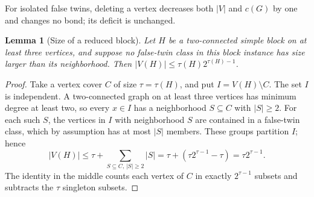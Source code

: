 \documentclass[11pt]{article}
\newtheorem{lemma}[theorem]{Lemma}
\begin{document}
For isolated false twins, deleting a vertex decreases both $|V|$
and $c(G)$ by one and changes no bond; its deficit is unchanged.

\begin{lemma}[Size of a reduced block]\label{lem:blocksize}
Let $H$ be a two-connected simple block on at least three vertices,
and suppose no false-twin class in this \emph{block instance} has
size larger than its neighborhood.  Then
$|V(H)|\leq\tau(H)2^{\tau(H)-1}$.
\end{lemma}
\begin{proof}
Take a vertex cover $C$ of size $\tau=\tau(H)$, and put
$I=V(H)\setminus C$.  The set $I$ is independent.  A two-connected
graph on at least three vertices has minimum degree at least two,
so every $x\in I$ has a neighborhood $S\subseteq C$ with $|S|\geq2$.
For each such $S$, the vertices in $I$ with neighborhood $S$ are
contained in a false-twin class, which by assumption has at most
$|S|$ members.  These groups partition $I$; hence
\[
 |V(H)|\leq\tau+
  \sum_{S\subseteq C,\,|S|\geq2}|S|
 =\tau+(\tau2^{\tau-1}-\tau)=\tau2^{\tau-1}.
\]
The identity in the middle counts each vertex of $C$ in exactly
$2^{\tau-1}$ subsets and subtracts the $\tau$ singleton subsets.
\end{proof}
\end{document}
